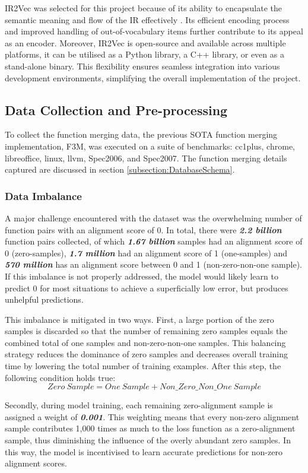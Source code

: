 IR2Vec was selected for this project because of its ability to encapsulate the semantic meaning and flow of the IR effectively \cite{IR2Vec}. Its efficient encoding process and improved handling of out-of-vocabulary items further contribute to its appeal as an encoder. Moreover, IR2Vec is open-source and available across multiple platforms, it can be utilised as a Python library, a C++ library, or even as a stand-alone binary. This flexibility ensures seamless integration into various development environments, simplifying the overall implementation of the project.

\subsection{Data Collection and Pre-processing}
To collect the function merging data, the previous SOTA function merging implementation, F3M, was executed on a suite of benchmarks: cc1plus, chrome, libreoffice, linux, llvm, Spec2006, and Spec2007. The function merging details captured are discussed in section \ref{subsection:DatabaseSchema}.


\subsubsection{Data Imbalance}
A major challenge encountered with the dataset was the overwhelming number of function pairs with an alignment score of 0. In total, there were \textbf{\textit{2.2 billion}} function pairs collected, of which \textbf{\textit{1.67 billion}} samples had an alignment score of 0 (zero-samples), \textbf{\textit{1.7 million}} had an alignment score of 1 (one-samples) and \textbf{\textit{570 million}} has an alignment score between 0 and 1 (non-zero-non-one sample). If this imbalance is not properly addressed, the model would likely learn to predict 0 for most situations to achieve a superficially low error, but produces unhelpful predictions.

This imbalance is mitigated in two ways. First, a large portion of the zero samples is discarded so that the number of remaining zero samples equals the combined total of one samples and non-zero-non-one samples. This balancing strategy reduces the dominance of zero samples and decreases overall training time by lowering the total number of training examples. After this step, the following condition holds true:
$$Zero\ Sample = One\ Sample + Non\_Zero\_Non\_One\ Sample$$

Secondly, during model training, each remaining zero-alignment sample is assigned a weight of \textbf{\textit{0.001}}. This weighting means that every non-zero alignment sample contributes 1,000 times as much to the loss function as a zero-alignment sample, thus diminishing the influence of the overly abundant zero samples. In this way, the model is incentivised to learn accurate predictions for non-zero alignment scores.


